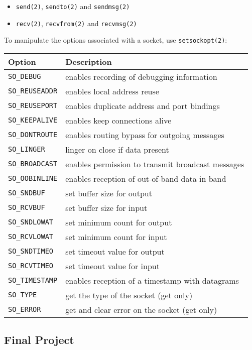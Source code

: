 \documentclass[xga]{xdvislides}
\begin{document}
\begin{itemize}
	\item {\tt send(2)}, {\tt sendto(2)} and {\tt sendmsg(2)}
	\item {\tt recv(2)}, {\tt recvfrom(2)} and {\tt recvmsg(2)}
\end{itemize}
To manipulate the options associated with a socket, use {\tt setsockopt(2)}:
\small
\begin{tabular}{| l | l |}
	\hline
	{\bf Option}		&	{\bf Description} \\
	\hline
	{\tt SO\_DEBUG}		&	enables recording of debugging information \\
	{\tt SO\_REUSEADDR}	&	enables local address reuse \\
	{\tt SO\_REUSEPORT}	&	enables duplicate address and port bindings \\
	{\tt SO\_KEEPALIVE}	&	enables keep connections alive\\
	{\tt SO\_DONTROUTE}	&	enables routing bypass for outgoing messages\\
	{\tt SO\_LINGER}	&	linger on close if data present\\
	{\tt SO\_BROADCAST}	&	enables permission to transmit broadcast messages\\
	{\tt SO\_OOBINLINE}	&	enables reception of out-of-band data in band\\
	{\tt SO\_SNDBUF}	&	set buffer size for output\\
	{\tt SO\_RCVBUF}	&	set buffer size for input\\
	{\tt SO\_SNDLOWAT}	&	set minimum count for output\\
	{\tt SO\_RCVLOWAT}	&	set minimum count for input\\
	{\tt SO\_SNDTIMEO}	&	set timeout value for output\\
	{\tt SO\_RCVTIMEO}	&	set timeout value for input\\
	{\tt SO\_TIMESTAMP}	&	enables reception of a timestamp with datagrams\\
	{\tt SO\_TYPE}		&	get the type of the socket (get only)\\
	{\tt SO\_ERROR}		&	get and clear error on the socket (get only)\\
	\hline
\end{tabular}
\Normalsize

\subsection{Final Project}
\end{document}
